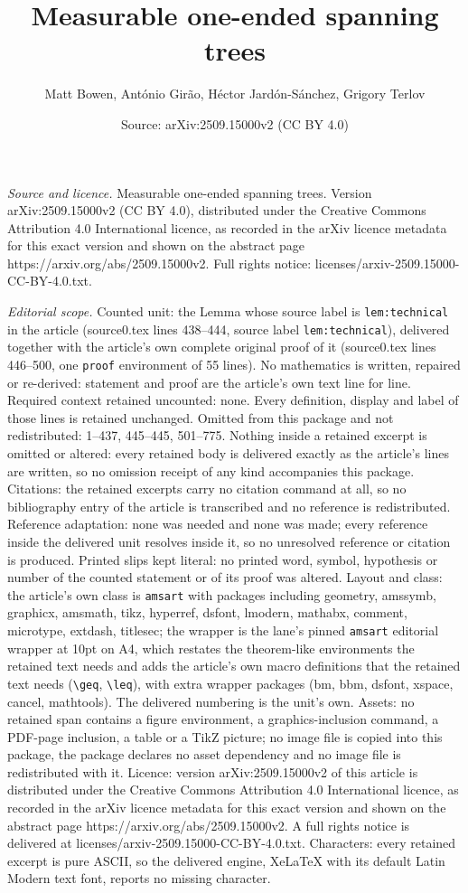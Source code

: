 \documentclass[10pt,a4paper]{amsart}
\title[Measurable one-ended spanning trees]{Measurable one-ended spanning trees}
\author{Matt Bowen, Ant\'onio Gir\~ao, H\'ector Jard\'on-S\'anchez, Grigory Terlov}
\date{Source: arXiv:2509.15000v2 (CC BY 4.0)}
\begin{document}
\maketitle

\noindent\emph{Source and licence.} Measurable one-ended spanning trees. Version arXiv:2509.15000v2 (CC BY 4.0), distributed under the Creative Commons Attribution 4.0 International licence, as recorded in the arXiv licence metadata for this exact version and shown on the abstract page https://arxiv.org/abs/2509.15000v2. Full rights notice: licenses/arxiv-2509.15000-CC-BY-4.0.txt.\par\smallskip

\noindent\textit{Editorial scope.} Counted unit: the Lemma whose source label is \texttt{lem:technical} in the article (source0.tex lines 438--444, source label \texttt{lem:technical}), delivered together with the article's own complete original proof of it (source0.tex lines 446--500, one \texttt{proof} environment of 55 lines). No mathematics is written, repaired or re-derived: statement and proof are the article's own text line for line. Required context retained uncounted: none. Every definition, display and label of those lines is retained unchanged. Omitted from this package and not redistributed: 1--437, 445--445, 501--775. Nothing inside a retained excerpt is omitted or altered: every retained body is delivered exactly as the article's lines are written, so no omission receipt of any kind accompanies this package. Citations: the retained excerpts carry no citation command at all, so no bibliography entry of the article is transcribed and no reference is redistributed. Reference adaptation: none was needed and none was made; every reference inside the delivered unit resolves inside it, so no unresolved reference or citation is produced. Printed slips kept literal: no printed word, symbol, hypothesis or number of the counted statement or of its proof was altered. Layout and class: the article's own class is \texttt{amsart} with packages including geometry, amssymb, graphicx, amsmath, tikz, hyperref, dsfont, lmodern, mathabx, comment, microtype, extdash, titlesec; the wrapper is the lane's pinned \texttt{amsart} editorial wrapper at 10pt on A4, which restates the theorem-like environments the retained text needs and adds the article's own macro definitions that the retained text needs (\texttt{\textbackslash geq}, \texttt{\textbackslash leq}), with extra wrapper packages (bm, bbm, dsfont, xspace, cancel, mathtools). The delivered numbering is the unit's own. Assets: no retained span contains a figure environment, a graphics-inclusion command, a PDF-page inclusion, a table or a TikZ picture; no image file is copied into this package, the package declares no asset dependency and no image file is redistributed with it. Licence: version arXiv:2509.15000v2 of this article is distributed under the Creative Commons Attribution 4.0 International licence, as recorded in the arXiv licence metadata for this exact version and shown on the abstract page https://arxiv.org/abs/2509.15000v2. A full rights notice is delivered at licenses/arxiv-2509.15000-CC-BY-4.0.txt. Characters: every retained excerpt is pure ASCII, so the delivered engine, XeLaTeX with its default Latin Modern text font, reports no missing character.
\end{document}
